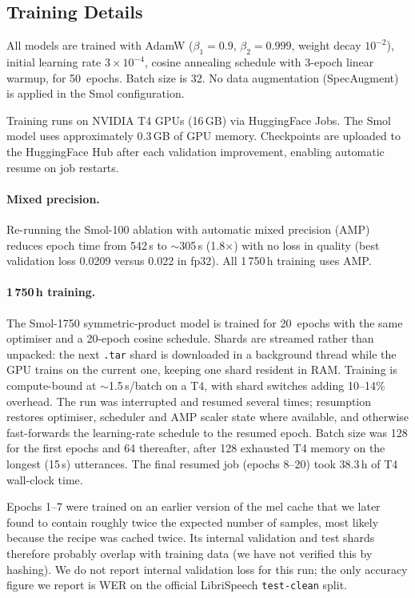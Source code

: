 \documentclass[11pt,a4paper]{article}
\begin{document}
\subsection{Training Details}

All models are trained with AdamW ($\beta_1=0.9$, $\beta_2=0.999$,
weight decay $10^{-2}$), initial learning rate $3 \times 10^{-4}$,
cosine annealing schedule with 3-epoch linear warmup, for 50~epochs.
Batch size is 32.  No data augmentation (SpecAugment) is applied in
the Smol configuration.

Training runs on NVIDIA T4 GPUs (16\,GB) via HuggingFace Jobs.  The
Smol model uses approximately 0.3\,GB of GPU memory.  Checkpoints are
uploaded to the HuggingFace Hub after each validation improvement,
enabling automatic resume on job restarts.

\paragraph{Mixed precision.}  Re-running the Smol-100 ablation with
automatic mixed precision (AMP) reduces epoch time from 542\,s to
$\sim$305\,s (1.8$\times$) with no loss in quality (best validation
loss 0.0209 versus 0.022 in fp32).  All 1\,750\,h training uses AMP.

\paragraph{1\,750\,h training.}  The Smol-1750 symmetric-product model
is trained for 20~epochs with the same optimiser and a 20-epoch cosine
schedule.  Shards are streamed rather than unpacked: the next
\texttt{.tar} shard is downloaded in a background thread while the GPU
trains on the current one, keeping one shard resident in RAM.  Training
is compute-bound at $\sim$1.5\,s/batch on a T4, with shard switches
adding 10--14\% overhead.  The run was interrupted and resumed several
times; resumption restores optimiser, scheduler and AMP scaler state
where available, and otherwise fast-forwards the learning-rate schedule
to the resumed epoch.  Batch size was 128 for the first epochs and 64
thereafter, after 128 exhausted T4 memory on the longest (15\,s)
utterances.  The final resumed job (epochs 8--20) took 38.3\,h of T4
wall-clock time.

Epochs 1--7 were trained on an earlier version of the mel cache that we
later found to contain roughly twice the expected number of samples,
most likely because the recipe was cached twice.  Its internal
validation and test shards therefore probably overlap with training
data (we have not verified this by hashing).  We do not report
internal validation loss for this run; the
only accuracy figure we report is WER on the official LibriSpeech
\texttt{test-clean} split.
\end{document}

